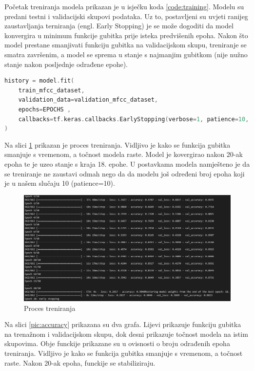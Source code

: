 Početak treniranja modela prikazan je u isječku koda \ref{code:training}. Modelu
su predani testni i validacijski skupovi podataka. Uz to, postavljeni su uvjeti ranijeg
zaustavljanja terniranja (engl. Early Stopping) je se može dogoditi da model
konvergira u minimum funkcije gubitka prije isteka predvišenih epoha. Nakon
što model prestane smanjivati funkciju gubitka na validacijskom skupu, treniranje
se smatra završenim, a model se sprema u stanje s najmanjim gubitkom (nije nužno 
stanje nakon posljednje odrađene epohe).

\begin{lstlisting}[language=C++, caption=Trening, label=code:training]
history = model.fit(
    train_mfcc_dataset,
    validation_data=validation_mfcc_dataset,
    epochs=EPOCHS ,
    callbacks=tf.keras.callbacks.EarlyStopping(verbose=1, patience=10, restore_best_weights=True),
)
\end{lstlisting}

Na slici \ref{pic:trening} prikazan je proces treniranja. Vidljivo je kako se funkcija
gubitka smanjuje s vremenom, a točnost modela raste. Model je kovergirao nakon 20-ak
epoha te je uzeo stanje s kraja 18. epohe. U postavkama modela namješteno je da se
treniranje ne zaustavi odmah nego da da modelu još određeni broj epoha koji je
u našem slučaju 10 (patience=10).

\begin{figure}[htb]
    \centering
    \includegraphics[width=0.7\linewidth]{Chapters/neuronska_mreza/trening/training.png} 
    \caption{Proces treniranja}
    \label{pic:trening}
\end{figure}

Na slici \ref{pic:accuracy} prikazana su dva grafa. Lijevi prikazuje funkciju gubitka
na trenažnom i validacijskom skupu, dok desni prikazuje točnost modela na istim skupovima.
Obje funckije prikazane su u ovisnosti o broju odrađenih epoha treniranja. Vidljivo je
kako se funkcija gubitka smanjuje s vremenom, a točnost raste. Nakon 20-ak epoha, funckije
se stabiliziraju. 

